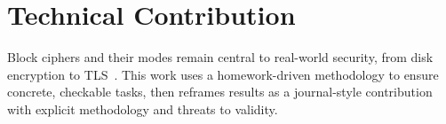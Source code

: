 \section{Technical Contribution}
\label{sec:technical-contribution}

Block ciphers and their modes remain central to real-world security, from disk encryption to TLS~\cite{daemen2002design}. This work uses a homework-driven methodology to ensure concrete, checkable tasks, then reframes results as a journal-style contribution with explicit methodology and threats to validity.


